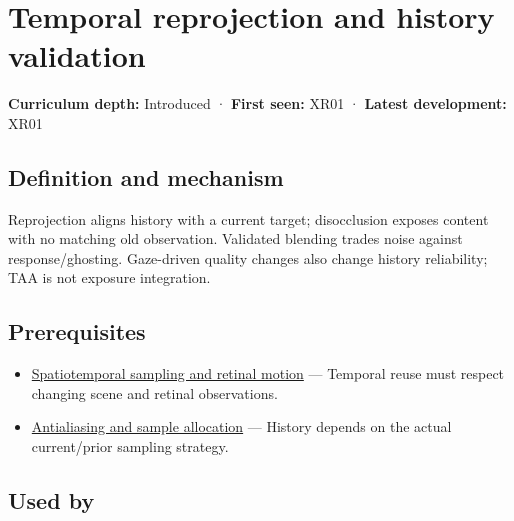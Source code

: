 \hypertarget{appendix-0727340a4428}{}\label{referencestart:appendix-0727340a4428}
\section{Temporal reprojection and history validation}\label{appendix-0727340a4428-temporal-reprojection-and-history-validation}

\hypertarget{appendix-0727340a4428-temporal-reprojection-and-history-validation}{}

\textbf{Curriculum depth:} Introduced · \textbf{First seen:} XR01 · \textbf{Latest development:} XR01

\begin{allmightroledefinition}

\subsection{Definition and mechanism}\label{appendix-0727340a4428-definition-and-mechanism}

\hypertarget{appendix-0727340a4428-definition-and-mechanism}{}

Reprojection aligns history with a current target; disocclusion exposes content with no matching old observation. Validated blending trades noise against response/ghosting. Gaze-driven quality changes also change history reliability; TAA is not exposure integration.

\end{allmightroledefinition}

\subsection{Prerequisites}\label{appendix-0727340a4428-prerequisites}

\hypertarget{appendix-0727340a4428-prerequisites}{}

\begin{itemize}
\tightlist
\item
  \hyperref[appendix-70895739febb]{Spatiotemporal sampling and retinal motion} --- Temporal reuse must respect changing scene and retinal observations.
\item
  \hyperref[appendix-4192b2bdd21e]{Antialiasing and sample allocation} --- History depends on the actual current/prior sampling strategy.
\end{itemize}

\subsection{Used by}\label{appendix-0727340a4428-used-by}

